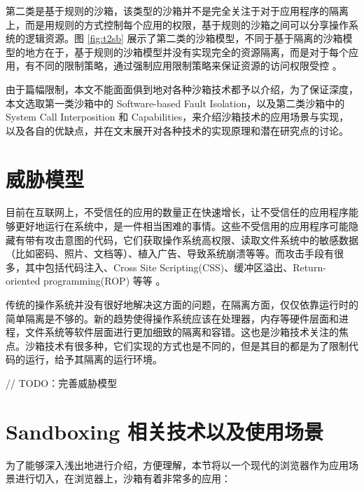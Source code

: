 \documentclass[preprint,12pt]{elsarticle}
\begin{document}
第二类是基于规则的沙箱，该类型的沙箱并不是完全关注于对于应用程序的隔离上，而是用规则的方式控制每个应用的权限，基于规则的沙箱之间可以分享操作系统的逻辑资源。图 \ref{fig:t2sb} 展示了第二类的沙箱模型，不同于基于隔离的沙箱模型的地方在于，基于规则的沙箱模型并没有实现完全的资源隔离，而是对于每个应用，有不同的限制策略，通过强制应用限制策略来保证资源的访问权限受控 \cite{schreuders}。

由于篇幅限制，本文不能面面俱到地对各种沙箱技术都予以介绍，为了保证深度，本文选取第一类沙箱中的 Software-based Fault Isolation，以及第二类沙箱中的 System Call Interposition 和 Capabilities，来介绍沙箱技术的应用场景与实现，以及各自的优缺点，并在文末展开对各种技术的实现原理和潜在研究点的讨论。

\section{威胁模型}
\label{s:threat_model}

目前在互联网上，不受信任的应用的数量正在快速增长，让不受信任的应用程序能够更好地运行在系统中，是一件相当困难的事情。这些不受信用的应用程序可能隐藏有带有攻击意图的代码，它们获取操作系统高权限、读取文件系统中的敏感数据（比如密码、照片、文档等）、植入广告、导致系统崩溃等等。而攻击手段有很多，其中包括代码注入、Cross Site Scripting(CSS)、缓冲区溢出、Return-oriented programming(ROP) 等等 \cite{miwa}。

传统的操作系统并没有很好地解决这方面的问题，在隔离方面，仅仅依靠运行时的简单隔离是不够的。新的趋势使得操作系统应该在处理器，内存等硬件层面和进程，文件系统等软件层面进行更加细致的隔离和容错。这也是沙箱技术关注的焦点。沙箱技术有很多种，它们实现的方式也是不同的，但是其目的都是为了限制代码的运行，给予其隔离的运行环境。

// TODO：完善威胁模型

\section{Sandboxing 相关技术以及使用场景}
\label{s:implementation}

为了能够深入浅出地进行介绍，方便理解，本节将以一个现代的浏览器作为应用场景进行切入，在浏览器上，沙箱有着非常多的应用：
\end{document}
